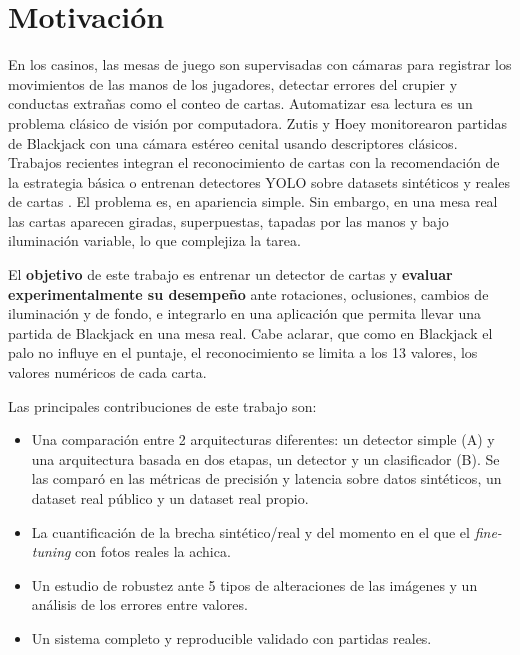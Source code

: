 \documentclass[conference,a4paper]{IEEEtran}
\begin{document}
\section{Motivación}

En los casinos, las mesas de juego son supervisadas con cámaras para registrar los movimientos de las manos de los jugadores, detectar errores del crupier y
conductas extrañas como el conteo de cartas. Automatizar esa lectura es un problema clásico de visión por computadora. Zutis y
Hoey \cite{zutis2009} monitorearon partidas de Blackjack con una cámara estéreo cenital usando descriptores clásicos.
Trabajos recientes integran el reconocimiento de cartas con la recomendación de la estrategia básica
\cite{gupta2024} o entrenan detectores YOLO sobre datasets sintéticos y reales de cartas \cite{kostadinov2024}. El
problema es, en apariencia simple. Sin embargo, en una mesa real las cartas aparecen giradas,
superpuestas, tapadas por las manos y bajo iluminación variable, lo que complejiza la tarea.

El \textbf{objetivo} de este trabajo es entrenar un detector de cartas y \textbf{evaluar experimentalmente su
desempeño} ante rotaciones, oclusiones, cambios de iluminación y de fondo, e integrarlo en una aplicación que permita
llevar una partida de Blackjack en una mesa real. Cabe aclarar, que como en Blackjack el palo no influye en el puntaje, el reconocimiento se limita a
los 13 valores, los valores numéricos de cada carta. 

Las principales contribuciones de este trabajo son:
\begin{itemize}
\item Una comparación entre 2 arquitecturas diferentes: un detector simple (A) y una arquitectura basada en dos etapas, un detector y un clasificador (B). Se las comparó en las métricas de precisión y latencia sobre datos
sintéticos, un dataset real público y un dataset real propio.
\item La cuantificación de la brecha sintético/real y del momento en el que el \textit{fine-tuning} con fotos reales la achica.
\item Un estudio de robustez ante 5 tipos de alteraciones de las imágenes y un análisis de los errores entre valores.
\item Un sistema completo y reproducible validado con partidas reales.
\end{itemize}
\end{document}
